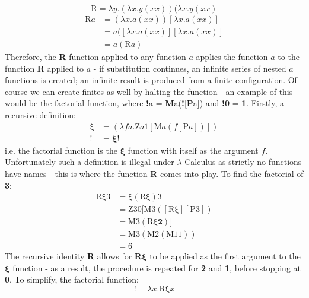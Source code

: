 \documentclass[Master.tex]{subfiles}
\begin{document}
\begin{equation*}
\bm{\mathrm{R}} = \lambda y.(\lambda x.y(xx))(\lambda x.y(xx)
\end{equation*}
\begin{equation*}
\begin{aligned}
\bm{\mathrm{R}}a &= (\lambda x.a(xx))[\lambda x.a(xx)]\\
&= a([\lambda x.a(xx)][\lambda x.a(xx)]\\
&= a(\bm{\mathrm{R}}a)
\end{aligned}
\end{equation*}
Therefore, the \textbf{R} function applied to any function $a$ applies the function $a$ to the function \textbf{R} applied to $a$ - if substitution continues, an infinite series of nested $a$ functions is created; an infinite result is produced from a finite configuration. Of course we can create finites as well by halting the function - an example of this would be the factorial function, where \textbf{!}a = \textbf{M}a(\textbf{!}[\textbf{P}a]) and \textbf{!0} = \textbf{1}. Firstly, a recursive definition:
\begin{equation*}
\begin{aligned}
\bm{\mathrm{\xi}} &= (\lambda fa.\bm{\mathrm{Z}}a\bm{\mathrm{1}}[\bm{\mathrm{M}}a(f[\bm{\mathrm{P}}a])])\\
\bm{!} &= \bm{\xi}!
\end{aligned}
\end{equation*}
i.e. the factorial function is the $\bm{\xi}$ function with itself as the argument $f$. Unfortunately such a definition is illegal under $\lambda$-Calculus as strictly no functions have names - this is where the function \textbf{R} comes into play. To find the factorial of \textbf{3}:
\begin{equation*}
\begin{aligned}
\bm{\mathrm{R\xi 3}} &= \bm{\mathrm{\xi}}(\bm{\mathrm{R\xi}})\bm{\mathrm{3}}\\
&= \bm{\mathrm{Z30}}[\bm{\mathrm{M3}}([\bm{\mathrm{R\xi}}][\bm{\mathrm{P3}}])\\
&= \bm{\mathrm{M3}}(\bm{\mathrm{R\xi}}\bm{2})]\\
&= \bm{\mathrm{M3}}(\bm{\mathrm{M2}}(\bm{\mathrm{M11}}))\\
&= \bm{\mathrm{6}}
\end{aligned}
\end{equation*}
The recursive identity \textbf{R} allows for \textbf{R}$\bm{\xi}$ to be applied as the first argument to the $\bm{\xi}$ function - as a result, the procedure is repeated for \textbf{2} and \textbf{1}, before stopping at \textbf{0}. To simplify, the factorial function:
\begin{equation*}
\bm{!} = \lambda x.\bm{\mathrm{R\xi}}x
\end{equation*}
\end{document}
